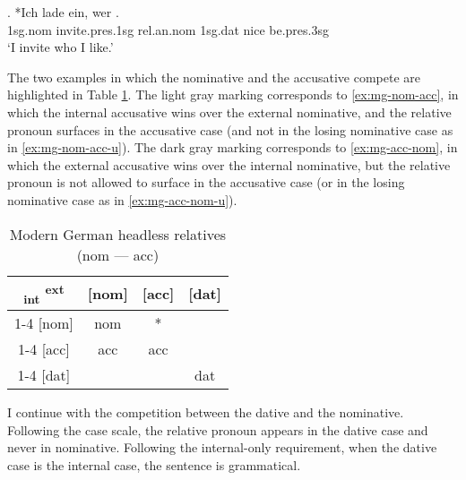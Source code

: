 \exg. *Ich {lade ein}, wer   .\\
1\ac{sg}.\ac{nom} invite.\ac{pres}.1\ac{sg}\scsub{[acc]} \ac{rel}.\ac{an}.\ac{nom} 1\ac{sg}.\ac{dat} nice be.\ac{pres}.3\ac{sg}\scsub{[nom]}\\
`I invite who I like.' \label{ex:mg-acc-nom-u}

The two examples in which the nominative and the accusative compete are highlighted in Table \ref{tbl:case-competition-mg-nom-acc}.
The light gray marking corresponds to \ref{ex:mg-nom-acc}, in which the internal accusative wins over the external nominative, and the relative pronoun surfaces in the accusative case (and not in the losing nominative case as in \ref{ex:mg-nom-acc-u}).
The dark gray marking corresponds to \ref{ex:mg-acc-nom}, in which the external accusative wins over the internal nominative, but the relative pronoun is not allowed to surface in the accusative case (or in the losing nominative case as in \ref{ex:mg-acc-nom-u}).

 \begin{table}[H]
   \center
   \caption{Modern German headless relatives (\ac{nom} --- \ac{acc})}
   \begin{tabular}{c|c|c|c}
     \toprule
     \textsubscript{\ac{int}} \textsuperscript{\ac{ext}}
            & [\ac{nom}]
            & [\ac{acc}]
            & [\ac{dat}]
            \\ \cmidrule{1-4}
        [\ac{nom}]
            & \ac{nom}
            & \cellcolor{DG}*
            &
            \\ \cmidrule{1-4}
        [\ac{acc}]
            & \cellcolor{LG}\ac{acc}
            & \ac{acc}
            &
            \\ \cmidrule{1-4}
        [\ac{dat}]
            &
            &
            & \ac{dat}
            \\
      \bottomrule
   \end{tabular}
     \label{tbl:case-competition-mg-nom-acc}
 \end{table}

I continue with the competition between the dative and the nominative. Following the case scale, the relative pronoun appears in the dative case and never in nominative. Following the internal-only requirement, when the dative case is the internal case, the sentence is grammatical.

